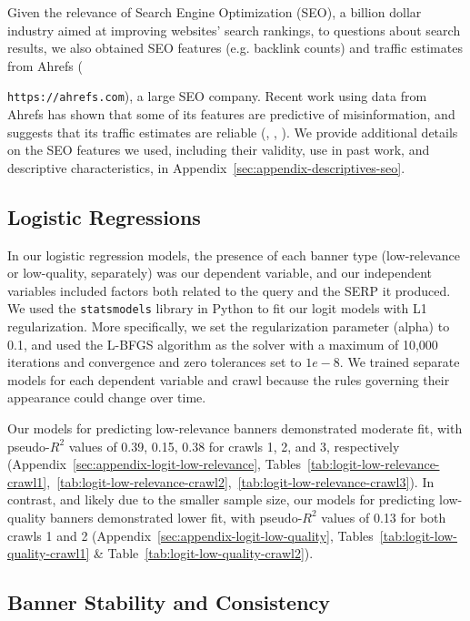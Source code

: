 Given the relevance of Search Engine Optimization (SEO), a billion dollar industry aimed at improving websites' search rankings, to questions about search results, we also obtained SEO features (e.g. backlink counts) and traffic estimates from Ahrefs ({\nolinkurl{https://ahrefs.com}), a large SEO company.
Recent work using data from Ahrefs has shown that some of its features are predictive of misinformation, and suggests that its traffic estimates are reliable (\cite{carragher2024detection}, \cite{carraghermisinformation}, \cite{williams2023search}). 
We provide additional details on the SEO features we used, including their validity, use in past work, and descriptive characteristics, in Appendix~\ref{sec:appendix-descriptives-seo}.

\subsection{Logistic Regressions}
\label{sec:methods-logit}

In our logistic regression models, the presence of each banner type (low-relevance or low-quality, separately) was our dependent variable, and our independent variables included factors both related to the query and the SERP it produced.
We used the \texttt{statsmodels} library in Python to fit our logit models with L1 regularization. More specifically, we set the regularization parameter (alpha) to 0.1, and used the L-BFGS algorithm as the solver with a maximum of 10,000 iterations and convergence and zero tolerances set to $1e-8$. 
We trained separate models for each dependent variable and crawl because the rules governing their appearance could change over time.

Our models for predicting low-relevance banners demonstrated moderate fit, with pseudo-$R^2$ values of 0.39, 0.15, 0.38 for crawls 1, 2, and 3, respectively (Appendix~\ref{sec:appendix-logit-low-relevance}, Tables~\ref{tab:logit-low-relevance-crawl1},~\ref{tab:logit-low-relevance-crawl2},~\ref{tab:logit-low-relevance-crawl3}). In contrast, and likely due to the smaller sample size, our models for predicting low-quality banners demonstrated lower fit, with pseudo-$R^2$ values of 0.13 for both crawls 1 and 2 (Appendix~\ref{sec:appendix-logit-low-quality}, Tables~\ref{tab:logit-low-quality-crawl1} \& Table~\ref{tab:logit-low-quality-crawl2}).

\subsection{Banner Stability and Consistency}
\label{sec:methods-stability}

}
